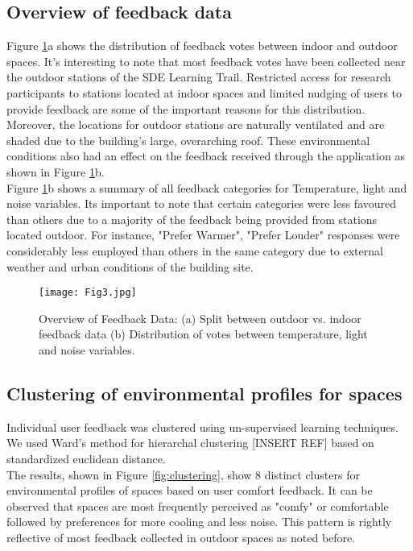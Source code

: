 

\subsection{Overview of feedback data}

Figure \ref{fig:feedbackdata}a shows the distribution of feedback votes between indoor and outdoor spaces. It's interesting to note that most feedback votes have been collected near the outdoor stations of the SDE Learning Trail. Restricted access for research participants to stations located at indoor spaces and limited nudging of users to provide feedback are some of the important reasons for this distribution. Moreover, the locations for outdoor stations are naturally ventilated and are shaded due to the building's large, overarching roof. These environmental conditions also had an effect on the feedback received through the application as shown in Figure \ref{fig:feedbackdata}b.\\

Figure \ref{fig:feedbackdata}b shows a summary of all feedback categories for Temperature, light and noise variables. Its important to note that certain categories were less favoured than others due to a majority of the feedback being provided from stations located outdoor. For instance, "Prefer Warmer", "Prefer Louder" responses were considerably less employed than others in the same category due to external weather and urban conditions of the building site.    


\begin{figure}
\begin{center}
\texttt{[image: Fig3.jpg]}
\caption{Overview of Feedback Data: (a) Split between outdoor vs. indoor feedback data (b) Distribution of votes between temperature, light and noise variables.}
\label{fig:feedbackdata}
\end{center}
\end{figure}


\subsection{Clustering of environmental profiles for spaces}
\label{ch:userResults}

Individual user feedback was clustered using un-supervised learning techniques. We used Ward's method for hierarchal clustering [INSERT REF] based on standardized euclidean distance.\\
The results, shown in Figure \ref{fig:clustering}, show 8 distinct clusters for environmental profiles of spaces based on user comfort feedback. It can be observed that spaces are most frequently perceived as "comfy" or comfortable followed by preferences for more cooling and less noise. This pattern is rightly reflective of most feedback collected in outdoor spaces as noted before.\\

